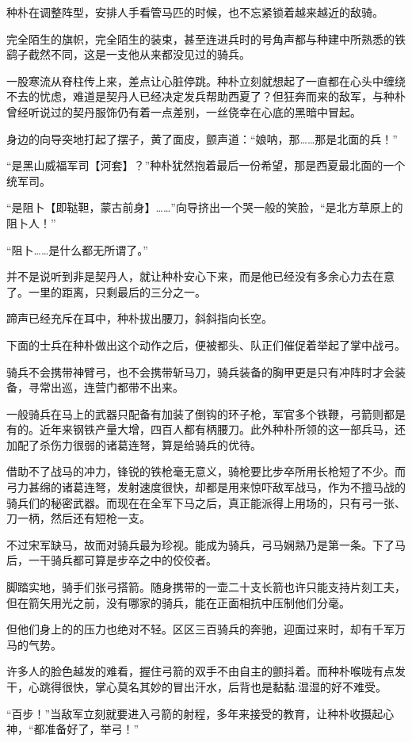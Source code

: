 种朴在调整阵型，安排人手看管马匹的时候，也不忘紧锁着越来越近的敌骑。

完全陌生的旗帜，完全陌生的装束，甚至连进兵时的号角声都与种建中所熟悉的铁鹞子截然不同，这是一支他从来都没见过的骑兵。

一股寒流从脊柱传上来，差点让心脏停跳。种朴立刻就想起了一直都在心头中缠绕不去的忧虑，难道是契丹人已经决定发兵帮助西夏了？但狂奔而来的敌军，与种朴曾经听说过的契丹服饰仍有着一点差别，一丝侥幸在心底的黑暗中冒起。

身边的向导突地打起了摆子，黄了面皮，颤声道：“娘呐，那……那是北面的兵！”

“是黑山威福军司【河套】？”种朴犹然抱着最后一份希望，那是西夏最北面的一个统军司。

“是阻卜【即鞑靼，蒙古前身】……”向导挤出一个哭一般的笑脸，“是北方草原上的阻卜人！”

“阻卜……是什么都无所谓了。”

并不是说听到非是契丹人，就让种朴安心下来，而是他已经没有多余心力去在意了。一里的距离，只剩最后的三分之一。

蹄声已经充斥在耳中，种朴拔出腰刀，斜斜指向长空。

下面的士兵在种朴做出这个动作之后，便被都头、队正们催促着举起了掌中战弓。

骑兵不会携带神臂弓，也不会携带斩马刀，骑兵装备的胸甲更是只有冲阵时才会装备，寻常出巡，连营门都带不出来。

一般骑兵在马上的武器只配备有加装了倒钩的环子枪，军官多个铁鞭，弓箭则都是有的。近年来钢铁产量大增，四百人都有柄腰刀。此外种朴所领的这一部兵马，还加配了杀伤力很弱的诸葛连弩，算是给骑兵的优待。

借助不了战马的冲力，锋锐的铁枪毫无意义，骑枪要比步卒所用长枪短了不少。而弓力甚绵的诸葛连弩，发射速度很快，却都是用来惊吓敌军战马，作为不擅马战的骑兵们的秘密武器。而现在在全军下马之后，真正能派得上用场的，只有弓一张、刀一柄，然后还有短枪一支。

不过宋军缺马，故而对骑兵最为珍视。能成为骑兵，弓马娴熟乃是第一条。下了马后，一干骑兵都可算是步卒之中的佼佼者。

脚踏实地，骑手们张弓搭箭。随身携带的一壶二十支长箭也许只能支持片刻工夫，但在箭矢用光之前，没有哪家的骑兵，能在正面相抗中压制他们分毫。

但他们身上的的压力也绝对不轻。区区三百骑兵的奔驰，迎面过来时，却有千军万马的气势。

许多人的脸色越发的难看，握住弓箭的双手不由自主的颤抖着。而种朴喉咙有点发干，心跳得很快，掌心莫名其妙的冒出汗水，后背也是黏黏.湿湿的好不难受。

“百步！”当敌军立刻就要进入弓箭的射程，多年来接受的教育，让种朴收摄起心神，“都准备好了，举弓！”


